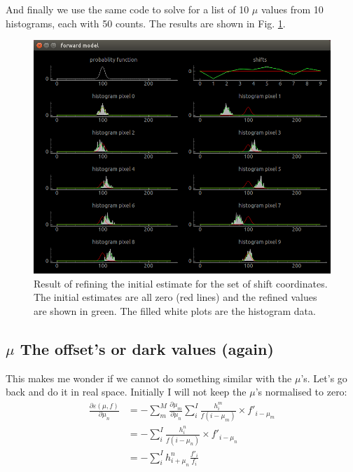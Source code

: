 \documentclass[11pt]{article}
\begin{document}
And finally we use the same code to solve for a list of 10 $\mu$ values from 10 histograms, each with 50 counts. The results are shown in Fig. \ref{more_mus}.
\begin{figure}[htp]
\centering
\includegraphics[scale=0.50]{figure_5.png}
\caption{Result of refining the initial estimate for the set of shift coordinates. The initial estimates are all zero (red lines) and the refined values are shown in green. The filled white plots are the histogram data. }
\label{more_mus}
\end{figure}








\subsection{$\mu$ The offset's or dark values (again)}
This makes me wonder if we cannot do something similar with the $\mu$'s. Let's go back and do it in real space. Initially I will not keep the $\mu$'s normalised to zero:
\begin{align}
   \frac{\partial \varepsilon(\mu, f)}{\partial \mu_n} &=-\sum_m^M  \frac{\partial \mu_m}{\partial \mu_n} \sum_i^I \frac{h^m_i}{f(i - \mu_m)} \times f'_{i-\mu_m} \\
   &=-\sum_i^I \frac{h^n_i}{f(i - \mu_n)} \times f'_{i-\mu_n} \\
   &=-\sum_i^I h^n_{i+\mu_n} \frac{f'_i}{f_i}       
   \label{mu_grad_real}
\end{align}
\end{document}
